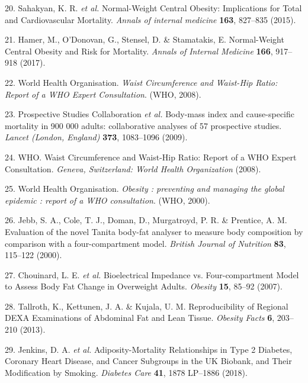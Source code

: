 \documentclass[11pt,twoside]{bristolthesis}
\begin{document}
\leavevmode\hypertarget{ref-Sahakyan2015}{}%
20. Sahakyan, K. R. \emph{et al.} Normal-Weight Central Obesity: Implications for Total and Cardiovascular Mortality. \emph{Annals of internal medicine} \textbf{163}, 827--835 (2015).

\leavevmode\hypertarget{ref-Hamer2017}{}%
21. Hamer, M., O'Donovan, G., Stensel, D. \& Stamatakis, E. Normal-Weight Central Obesity and Risk for Mortality. \emph{Annals of Internal Medicine} \textbf{166}, 917--918 (2017).

\leavevmode\hypertarget{ref-WorldHealthOrganisation2008}{}%
22. World Health Organisation. \emph{Waist Circumference and Waist-Hip Ratio: Report of a WHO Expert Consultation}. (WHO, 2008).

\leavevmode\hypertarget{ref-Collaboration2009}{}%
23. Prospective Studies Collaboration \emph{et al.} Body-mass index and cause-specific mortality in 900 000 adults: collaborative analyses of 57 prospective studies. \emph{Lancet (London, England)} \textbf{373}, 1083--1096 (2009).

\leavevmode\hypertarget{ref-WHO2008}{}%
24. WHO. Waist Circumference and Waist-Hip Ratio: Report of a WHO Expert Consultation. \emph{Geneva, Switzerland: World Health Organization} (2008).

\leavevmode\hypertarget{ref-WorldHealthOrganisation2000}{}%
25. World Health Organisation. \emph{Obesity : preventing and managing the global epidemic : report of a WHO consultation}. (WHO, 2000).

\leavevmode\hypertarget{ref-Jebb2000}{}%
26. Jebb, S. A., Cole, T. J., Doman, D., Murgatroyd, P. R. \& Prentice, A. M. Evaluation of the novel Tanita body-fat analyser to measure body composition by comparison with a four-compartment model. \emph{British Journal of Nutrition} \textbf{83}, 115--122 (2000).

\leavevmode\hypertarget{ref-Chouinard2007}{}%
27. Chouinard, L. E. \emph{et al.} Bioelectrical Impedance vs. Four-compartment Model to Assess Body Fat Change in Overweight Adults. \emph{Obesity} \textbf{15}, 85--92 (2007).

\leavevmode\hypertarget{ref-Tallroth2013}{}%
28. Tallroth, K., Kettunen, J. A. \& Kujala, U. M. Reproducibility of Regional DEXA Examinations of Abdominal Fat and Lean Tissue. \emph{Obesity Facts} \textbf{6}, 203--210 (2013).

\leavevmode\hypertarget{ref-Jenkins2018}{}%
29. Jenkins, D. A. \emph{et al.} Adiposity-Mortality Relationships in Type 2 Diabetes, Coronary Heart Disease, and Cancer Subgroups in the UK Biobank, and Their Modification by Smoking. \emph{Diabetes Care} \textbf{41}, 1878 LP--1886 (2018).
\end{document}
